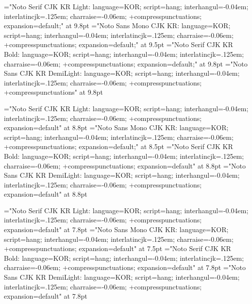 


%
\sethangulfont\tenmj="Noto Serif CJK KR Light:%
  language=KOR;%
  script=hang;%
  interhangul=-0.04em;%
  interlatincjk=.125em;%
  charraise=-0.06em;%
  +compresspunctuations;%
  expansion=default;" at 9.8pt
\sethangulfont\tentz="Noto Sans Mono CJK KR:%
  language=KOR;%
  script=hang;%
  interhangul=-0.04em;%
  interlatincjk=.125em;%
  charraise=-0.06em;%
  +compresspunctuations;%
  expansion=default;" at 9.5pt
\sethangulfont\tenbd="Noto Serif CJK KR Bold:%
  language=KOR;%
  script=hang;%
  interhangul=-0.04em;%
  interlatincjk=.125em;%
  charraise=-0.06em;%
  +compresspunctuations;%
  expansion=default;" at 9.8pt
\sethangulfont\tengt="Noto Sans CJK KR DemiLight:%
  language=KOR;%
  script=hang;%
  interhangul=-0.04em;%
  interlatincjk=.125em;%
  charraise=-0.06em;%
  +compresspunctuations;%
  +compresspunctuations" at 9.8pt

\sethangulfont\ninemj="Noto Serif CJK KR Light:%
  language=KOR;%
  script=hang;%
  interhangul=-0.04em;%
  interlatincjk=.125em;%
  charraise=-0.06em;%
  +compresspunctuations;%
  expansion=default" at 8.8pt
\sethangulfont\ninetz="Noto Sans Mono CJK KR:
  language=KOR;%
  script=hang;%
  interhangul=-0.04em;%
  interlatincjk=.125em;%
  charraise=-0.06em;%
  +compresspunctuations;%
  expansion=default;" at 8.5pt
\sethangulfont\ninebd="Noto Serif CJK KR Bold:%
  language=KOR;%
  script=hang;%
  interhangul=-0.04em;%
  interlatincjk=.125em;%
  charraise=-0.06em;%
  +compresspunctuations;%
  expansion=default" at 8.8pt
\sethangulfont\ninegt="Noto Sans CJK KR DemiLight:%
  language=KOR;%
  script=hang;%
  interhangul=-0.04em;%
  interlatincjk=.125em;%
  charraise=-0.06em;%
  +compresspunctuations;%
  expansion=default" at 8.8pt

\sethangulfont\eightmj="Noto Serif CJK KR Light:%
  language=KOR;%
  script=hang;%
  interhangul=-0.04em;%
  interlatincjk=.125em;%
  charraise=-0.06em;%
  +compresspunctuations;%
  expansion=default" at 7.8pt
\sethangulfont\eighttz="Noto Sans Mono CJK KR:%
  language=KOR;%
  script=hang;%
  interhangul=-0.04em;%
  interlatincjk=.125em;%
  charraise=-0.06em;%
  +compresspunctuations;%
  expansion=default" at 7.5pt
\sethangulfont\eightbd="Noto Serif CJK KR Bold:%
  language=KOR;%
  script=hang;%
  interhangul=-0.04em;%
  interlatincjk=.125em;%
  charraise=-0.06em;%
  +compresspunctuations;%
  expansion=default" at 7.8pt
\sethangulfont\eightgt="Noto Sans CJK KR DemiLight:%
  language=KOR;%
  script=hang;%
  interhangul=-0.04em;%
  interlatincjk=.125em;%
  charraise=-0.06em;%
  +compresspunctuations;%
  expansion=default" at 7.8pt

